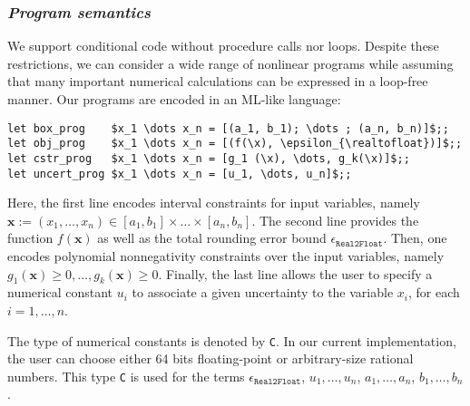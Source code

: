 \documentclass[preprint]{sigplanconf}
\newcommand{\code}[1]{\lstinline{#1}}
\newcommand{\x}{\mathbf{x}}
\newcommand{\realtofloat}{\mathtt{Real2Float}}
\theoremstyle{plain}
\begin{document}
\subsubsection*{\textit{Program semantics}}
%
We support conditional code without procedure calls nor loops. Despite these restrictions, we can consider a wide range of nonlinear programs while assuming that many important numerical calculations can be expressed in a loop-free manner. 
Our programs are encoded in an ML-like language:
\begin{lstlisting}
let box_prog    $x_1 \dots x_n = [(a_1, b_1); \dots ; (a_n, b_n)]$;;
let obj_prog    $x_1 \dots x_n = [(f(\x), \epsilon_{\realtofloat})]$;;
let cstr_prog   $x_1 \dots x_n = [g_1 (\x), \dots, g_k(\x)]$;;
let uncert_prog $x_1 \dots x_n = [u_1, \dots, u_n]$;;
\end{lstlisting}
Here, the first line encodes interval constraints for input variables, namely $\x := (x_1, \dots, x_n) \in [a_1, b_1]\times \dots \times [a_n, b_n]$.
The second line provides the function $f(\x)$ as well as the total rounding error bound $\epsilon_{\realtofloat}$.
Then, one encodes polynomial nonnegativity constraints over the input variables, namely $g_1(\x) \geq 0, \dots, g_k(\x) \geq 0$. Finally, the last line allows the user to specify a numerical constant $u_i$ to associate a given uncertainty to the variable $x_i$, for each $i= 1, \dots, n$.

The type of numerical constants is denoted by \code{C}. In our current implementation, the user can choose either 64 bits floating-point or arbitrary-size rational numbers. This type \code{C} is used for the terms $\epsilon_{\realtofloat}$, $u_1, \dots, u_n$, $a_1, \dots, a_n$, $b_1, \dots, b_n$.
\end{document}
